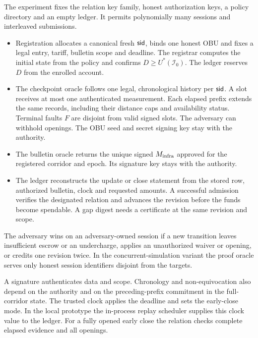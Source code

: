 \begin{definition}
\label{def:solv}
The experiment fixes the relation key family, honest authorization keys, a policy directory and an empty ledger. It permits polynomially many sessions and interleaved submissions.
\begin{itemize}
\item Registration allocates a canonical fresh $\mathsf{sid}$, binds one honest OBU and fixes a legal entry, tariff, bulletin scope and deadline. The registrar computes the initial state from the policy and confirms $D\ge U^*(\mathcal I_0)$. The ledger reserves $D$ from the enrolled account.
\item The checkpoint oracle follows one legal, chronological history per $\mathsf{sid}$. A slot receives at most one authenticated measurement. Each elapsed prefix extends the same records, including their distance caps and availability status. Terminal faults $F$ are disjoint from valid signed slots. The adversary can withhold openings. The OBU seed and secret signing key stay with the authority.
\item The bulletin oracle returns the unique signed $M_{\mathrm{infra}}$ approved for the registered corridor and epoch. Its signature key stays with the authority.
\item The ledger reconstructs the update or close statement from the stored row, authorized bulletin, clock and requested amounts. A successful admission verifies the designated relation and advances the revision before the funds become spendable. A gap digest needs a certificate at the same revision and scope.
\end{itemize}
The adversary wins on an adversary-owned session if a new transition leaves insufficient escrow or an undercharge, applies an unauthorized waiver or opening, or credits one revision twice. In the concurrent-simulation variant the proof oracle serves only honest session identifiers disjoint from the targets.
\end{definition}

A signature authenticates data and scope. Chronology and non-equivocation also depend on the authority and on the preceding-prefix commitment in the full-corridor state. The trusted clock applies the deadline and sets the early-close mode. In the local prototype the in-process replay scheduler supplies this clock value to the ledger. For a fully opened early close the relation checks complete elapsed evidence and all openings.

